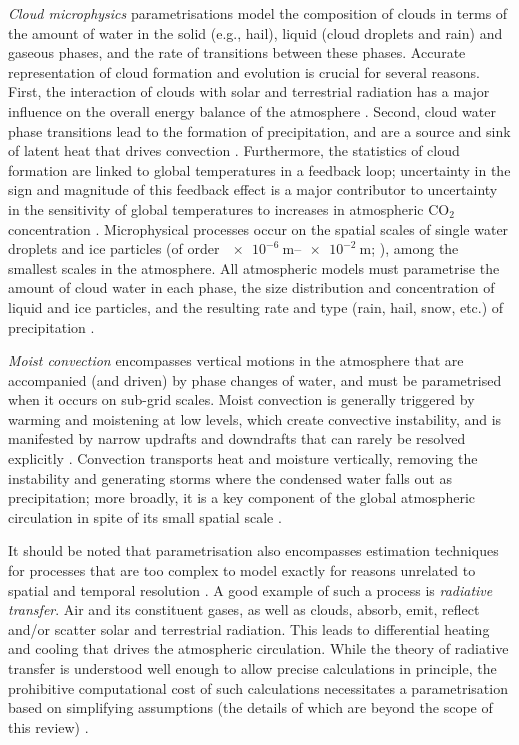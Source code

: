 \documentclass[../main.tex]{subfiles}
\begin{document}
\emph{Cloud microphysics} parametrisations model the composition of clouds in
terms of the amount of water in the solid (e.g., hail), liquid (cloud droplets
and rain) and gaseous phases, and the rate of transitions between these phases.
Accurate representation of cloud formation and evolution is crucial for several
reasons. First, the interaction of clouds with solar and terrestrial radiation
has a major influence on the overall energy balance of the atmosphere
\parencite{mcfarlane2011}. Second, cloud water phase transitions lead to the
formation of precipitation, and are a source and sink of latent heat that
drives convection \parencite{mcfarlane2011}. Furthermore, the statistics of
cloud formation are linked to global temperatures in a feedback loop;
uncertainty in the sign and magnitude of this feedback effect is a major
contributor to uncertainty in the sensitivity of global temperatures to
increases in atmospheric CO$_2$ concentration \parencite{andrews2012,
christensen2022,stevens2013}. Microphysical processes occur on the spatial
scales of single water droplets and ice particles (of order
$\SIrange{e-6}{e-2}{\meter}$; \textcite{lamb2003}), among the smallest scales
in the atmosphere. All atmospheric models must parametrise the amount of cloud
water in each phase, the size distribution and concentration of liquid and ice
particles, and the resulting rate and type (rain, hail, snow, etc.) of
precipitation \parencite{christensen2022}.

\emph{Moist convection} encompasses vertical motions in the atmosphere that are
accompanied (and driven) by phase changes of water, and must be parametrised
when it occurs on sub-grid scales. Moist convection is generally triggered by
warming and moistening at low levels, which create convective instability, and
is manifested by narrow updrafts and downdrafts that can rarely be resolved
explicitly \parencite{mcfarlane2011}. Convection transports heat and moisture
vertically, removing the instability and generating storms where the condensed
water falls out as precipitation; more broadly, it is a key component of the
global atmospheric circulation in spite of its small spatial scale
\parencite{christensen2022}.

It should be noted that parametrisation also encompasses estimation techniques
for processes that are too complex to model exactly for reasons unrelated to
spatial and temporal resolution \parencite{mcfarlane2011}. A good example of
such a process is \emph{radiative transfer}. Air and its constituent gases, as
well as clouds, absorb, emit, reflect and/or scatter solar and terrestrial
radiation. This leads to differential heating and cooling that drives the
atmospheric circulation. While the theory of radiative transfer is understood
well enough to allow precise calculations in principle, the prohibitive
computational cost of such calculations necessitates a parametrisation based on
simplifying assumptions (the details of which are beyond the scope of this
review) \parencite{christensen2022}.
\end{document}
